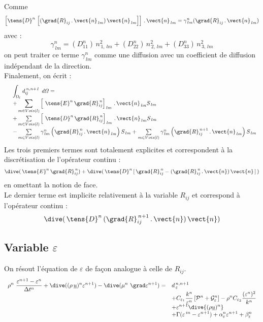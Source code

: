 Comme $$\left[ \tens{D}^n\,\left[ (\grad{R}_{ij}\,.\,\vect{n}_{\,lm})\,\vect{n}_{\,lm}
\right] \right]\,.\,\vect{n}_{\,lm}  = \gamma^n_{\,lm} (\grad{R}_{ij}\,.\,\vect{n}_{\,lm})$$
 avec :
$$\gamma^n_{\,lm} = (D^n_{11})\,n^2_{\,1,\,lm} + (D^n_{22})\,n^2_{\,2,\,lm} +
(D^n_{33})\,n^2_{\,3,\,lm}$$
 on peut traiter ce terme $\gamma^n_{\,lm}$ comme une diffusion avec un
coefficient de diffusion ind\'ependant de la direction.\\

Finalement, on \'ecrit :
\begin{equation}
\begin{array} {lll}
&\displaystyle\int_{\Omega_l} \it{d}_{ij}^{\,n,n+1}\ d\Omega =\\
&\displaystyle
+ \sum\limits_{m\in
Vois(l)} \left[\ \tens{E}^n\,\grad{R}^{\,n}_{ij} \right]_{\,lm}\,.\,\vect{n}_{\,lm}S_{\,lm}\\
&+ \sum\limits_{m\in Vois(l)} \left[\
\tens{D}^n\,\grad{R}^{\,n}_{ij} \right]_{\,lm}\,.\,\vect{n}_{\,lm}S_{\,lm}\\
& - \sum\limits_{m\in Vois(l)} \gamma^n_{\,lm} \left(
\grad{R}^{\,n}_{ij}\,.\,\vect{n}_{\,lm} \right) S_{\,lm} +  \sum\limits_{m\in
Vois(l)} \gamma^n_{\,lm} \left( \grad{R}^{\,n+1}_{ij}\,.\,\vect{n}_{\,lm} \right)  S_{\,lm}
\end{array}
\end{equation}
Les trois premiers termes sont totalement explicites et correspondent \`a la
discr\'etisation de l'op\'erateur continu :
$$\dive(\,\tens{E}^n\,\grad{R}^{\,n}_{ij}) + \dive(\,\tens{D}^n\,[\,\grad{R}^{\,n}_{ij} - ( \grad{R}^{\,n}_{ij}\,.\,\vect{n}
)\,\vect{n}\,]\,)$$ en omettant la notion de face.\\
Le dernier terme est implicite relativement \`a la variable $R_{ij}$ et correspond \`a l'op\'erateur continu :
 $$\dive(\,\tens{D}^n\,(\grad{R}^{\,n+1}_{ij}\,.\,\vect{n} )\,\vect{n})$$
\subsection*{\bf Variable $\varepsilon$ }
On r\'esout l'\'equation de $\varepsilon$ de fa\c con analogue \`a celle de
$R_{ij}$.
\begin{equation}
\begin{array}{ll}
\displaystyle
\rho^n\ \frac {\varepsilon^{n+1}-\varepsilon^{n}}{\Delta t^n} +
\dive((\rho\,\underline{u})^{n} \varepsilon^{n+1})
- \dive(\mu^n\ \grad \varepsilon^{n+1})
=  &
\displaystyle
d_{\,\varepsilon}^{\,n,n+1} \\
&
\displaystyle
+ C_{\varepsilon_1} \frac{k^n}{\varepsilon^n} \left[ \mathcal{P}^n + \mathcal{G}^n_{\varepsilon} \right]
- \rho^n C_{\varepsilon_2} \frac{(\varepsilon^n)^2}{k^n} \\
&
\displaystyle
+ \varepsilon^{n+1} \dive{(\rho \underline{u})^n} \\
&
\displaystyle
+ \Gamma(\varepsilon^{\,in} - \varepsilon^{n+1})
+ \alpha^n_{\varepsilon} \varepsilon^{n+1} + \beta^n_{\varepsilon}
\end{array}
\end{equation}

